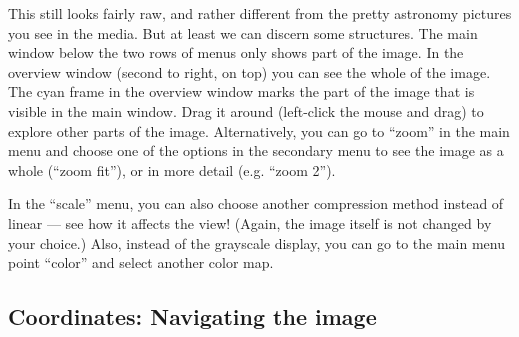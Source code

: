 \documentclass[twocolumn,apj]{openjournal}
\begin{document}
This still looks fairly raw, and rather different from the pretty astronomy pictures you see in the media. But at least we can discern some structures. The main window below the two rows of menus only shows part of the image. In the overview window (second to right, on top) you can see the whole of the image. The cyan frame in the overview window marks the part of the image that is visible in the main window. Drag it around (left-click the mouse and drag) to explore other parts of the image. Alternatively, you can go to ``zoom'' in the main menu and choose one of the options in the secondary menu to see the image as a whole (``zoom fit''), or in more detail (e.g. ``zoom 2'').

In the ``scale'' menu, you can also choose another compression method instead of linear --- see how it affects the view! (Again, the image itself is not changed by your choice.) Also, instead of the grayscale display, you can go to the main menu point ``color'' and select another color map. 

\subsection{Coordinates: Navigating the image}
\end{document}
